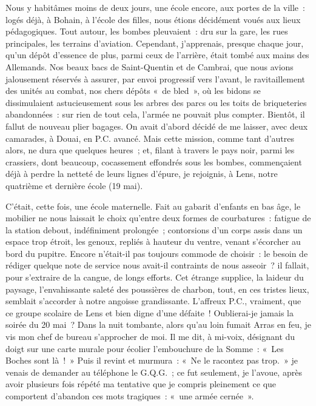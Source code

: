 \documentclass[french,twoside]{book} %
\begin{document}
Nous y habitâmes moins de deux jours, une école encore, aux portes de la ville : logés déjà, à Bohain, à l’école des filles, nous étions décidément voués aux lieux pédagogiques. Tout autour, les bombes pleuvaient : dru sur la gare, les rues principales, les terrains d’aviation. Cependant, j’apprenais, presque chaque jour, qu’un dépôt d’essence de plus, parmi   ceux de l’arrière, était tombé aux mains des Allemands. Nos beaux bacs de Saint-Quentin et de Cambrai, que nous avions jalousement réservés à assurer, par envoi progressif vers l’avant, le ravitaillement des unités au combat, nos chers dépôts « de bled », où les bidons se dissimulaient astucieusement sous les arbres des parcs ou les toits de briqueteries abandonnées : sur rien de tout cela, l’armée ne pouvait plus compter. Bientôt, il fallut de nouveau plier bagages. On avait d’abord décidé de me laisser, avec deux camarades, à Douai, en P.C. avancé. Mais cette mission, comme tant d’autres alors, ne dura que quelques heures ; et, filant à travers le pays noir, parmi les crassiers, dont beaucoup, cocassement effondrés sous les bombes, commençaient déjà à perdre la netteté de leurs lignes d’épure, je rejoignis, à Lens, notre quatrième et dernière école (19 mai).\par
C’était, cette fois, une école maternelle. Fait au gabarit d’enfants en bas âge, le mobilier ne nous laissait le choix qu’entre deux formes de courbatures : fatigue de la station debout, indéfiniment prolongée ; contorsions d’un corps assis dans un espace trop étroit, les genoux, repliés à hauteur du ventre, venant s’écorcher au bord du pupitre. Encore n’était-il pas toujours commode de choisir : le besoin de rédiger quelque note de service nous avait-il contraints de nous asseoir ? il fallait, pour s’extraire de la cangue, de longs efforts. Cet étrange supplice, la laideur du paysage, l’envahissante saleté des poussières de charbon, tout, en ces tristes lieux, semblait s’accorder à notre angoisse grandissante. L’affreux P.C., vraiment, que ce groupe scolaire de Lens et bien digne d’une défaite ! Oublierai-je jamais la soirée du 20 mai ? Dans la nuit tombante, alors qu’au loin fumait Arras en feu, je vis mon chef de bureau s’approcher de moi. Il me dit, à mi-voix, désignant du doigt sur une carte murale pour écolier l’embouchure de la Somme : « Les Boches   sont là ! » Puis il revint et murmura : « Ne le racontez pas trop. » je venais de demander au téléphone le G.Q.G. ; ce fut seulement, je l’avoue, après avoir plusieurs fois répété ma tentative que je compris pleinement ce que comportent d’abandon ces mots tragiques : « une armée cernée ».\par
\end{document}

